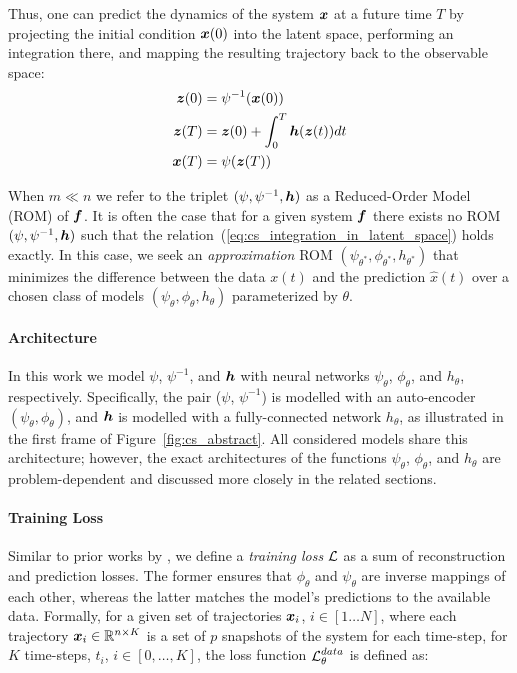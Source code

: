  Thus, one can predict the dynamics of the system $\boldsymbol{x}$ at a future time $T$ by projecting the initial condition $\boldsymbol{x}(0)$ into the latent space, performing an integration there, and mapping the resulting trajectory back to the observable space:
\begin{equation}
\label{eq:cs_integration_in_latent_space}
\begin{split}
    \boldsymbol{z}(0) & = \psi^{-1}(\boldsymbol{x}(0)) \\
    \boldsymbol{z}(T) & = \boldsymbol{z}(0) + \int_{0}^T\boldsymbol{h}(\boldsymbol{z}(t))dt \\
    \boldsymbol{x}(T) & = \psi(\boldsymbol{z}(T))
\end{split}
\end{equation}

When $m \ll n$ we refer to the triplet $(\psi, \psi^{-1}, \boldsymbol{h})$ as a Reduced-Order Model (ROM) of $\boldsymbol{f}$. It is often the case that for a given system $\boldsymbol{f}$ there exists no ROM $(\psi, \psi^{-1}, \boldsymbol{h})$ such that the relation~(\ref{eq:cs_integration_in_latent_space}) holds exactly. In this case, we seek an \textit{approximation} ROM $(\psi_{\theta^*}, \phi_{\theta^*}, h_{\theta^*})$ that minimizes the difference between the data $x(t)$ and the prediction $\hat{x}(t)$ over a chosen class of models $(\psi_\theta, \phi_\theta, h_\theta)$ parameterized by $\theta$.


\paragraph{Architecture} In this work we model $\psi$, $\psi^{-1}$, and $\boldsymbol{h}$ with neural networks $\psi_\theta$, $\phi_\theta$, and $h_\theta$, respectively. Specifically, the pair ($\psi$, $\psi^{-1}$) is modelled with an auto-encoder $(\psi_\theta, \phi_\theta)$, and $\boldsymbol{h}$ is modelled with a fully-connected network $h_\theta$, as illustrated in the first frame of Figure~\ref{fig:cs_abstract}. All considered models share this architecture; however, the exact architectures of the functions $\psi_\theta$, $\phi_\theta$, and $h_\theta$ are problem-dependent and discussed more closely in the related sections. 

\paragraph{Training Loss} Similar to prior works by \citep{takeishi2017learning,morton2019deep,gin2021deep}, we define a \textit{training loss} $\operatorname{\mathcal{L}}$ as a sum of reconstruction and prediction losses. The former ensures that $\phi_\theta$ and $\psi_\theta$ are inverse mappings of each other, whereas the latter matches the model's predictions to the available data. Formally, for a given set of trajectories $\boldsymbol{x}_i$, $i \in [1 \dots N]$, where each trajectory $\boldsymbol{x}_i \in \mathbb{R}^{n \times K}$ is a set of $p$ snapshots of the system for each time-step, for $K$ time-steps, $t_i$, $i \in [0, \dots, K]$, the loss function $\operatorname{\mathcal{L}}^{data}_\theta$ is defined as:

